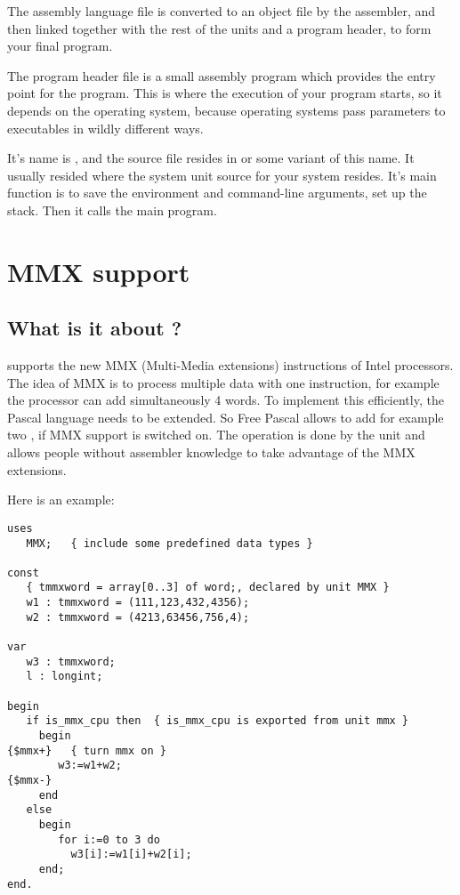 \documentclass{report}
\begin{document}
The assembly language file is converted to an object file by the assembler,
and then linked together with the rest of the units and a program header, to
form your final program. 

The program header file is a small assembly program which provides the entry
point for the program. This is where the execution of your program starts,
so it depends on the operating system, because operating systems pass
parameters to executables in wildly different ways. 

It's name is , and the
source file resides in  or some variant of this name. It
usually resided where the system unit source for your system resides.
It's main function is to save the environment and command-line arguments, 
set up the stack. Then it calls the main program.

\chapter{MMX support}
\label{ch:MMXSupport}

\section{What is it about ?}
\label{se:WhatisMMXabout}
\fpc supports the new MMX (Multi-Media extensions)
instructions of Intel processors. The idea of MMX is to
process multiple data with one instruction, for example the processor
can add simultaneously 4 words. To implement this efficiently, the
Pascal language needs to be extended. So Free Pascal allows
to add for example two ,
if MMX support is switched on. The operation is done
by the  unit and allows people without assembler knowledge to take
advantage of the MMX extensions.

Here is an example:
\begin{verbatim}
uses
   MMX;   { include some predefined data types }

const
   { tmmxword = array[0..3] of word;, declared by unit MMX }
   w1 : tmmxword = (111,123,432,4356);
   w2 : tmmxword = (4213,63456,756,4);

var
   w3 : tmmxword;
   l : longint;

begin
   if is_mmx_cpu then  { is_mmx_cpu is exported from unit mmx }
     begin
{$mmx+}   { turn mmx on }
        w3:=w1+w2;
{$mmx-}
     end
   else
     begin
        for i:=0 to 3 do
          w3[i]:=w1[i]+w2[i];
     end;
end.
\end{verbatim}
\end{document}
